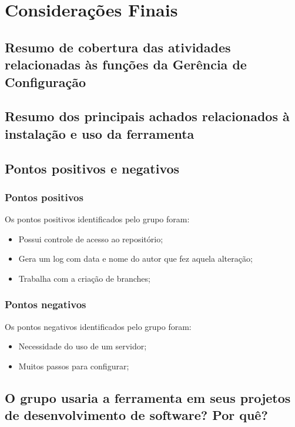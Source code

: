 \chapter[Considerações Finais]{Considerações Finais}

\section{Resumo de cobertura das atividades relacionadas às funções da Gerência de Configuração}
\section{Resumo dos principais achados relacionados à instalação e uso da ferramenta}
\section{Pontos positivos e negativos}

	\subsection{Pontos positivos}

		Os pontos positivos identificados pelo grupo foram:

		\begin{itemize}

			\item Possui controle de acesso ao repositório;
			\item Gera um log com data e nome do autor que fez aquela alteração;
			\item Trabalha com a criação de branches; 


		\end{itemize}




	\subsection{Pontos negativos}

		Os pontos negativos identificados pelo grupo foram:

		\begin{itemize}

			\item Necessidade do uso de um servidor;
			\item Muitos passos para configurar;

		\end{itemize}


\section{O grupo usaria a ferramenta em seus projetos de desenvolvimento de software? Por quê?}
